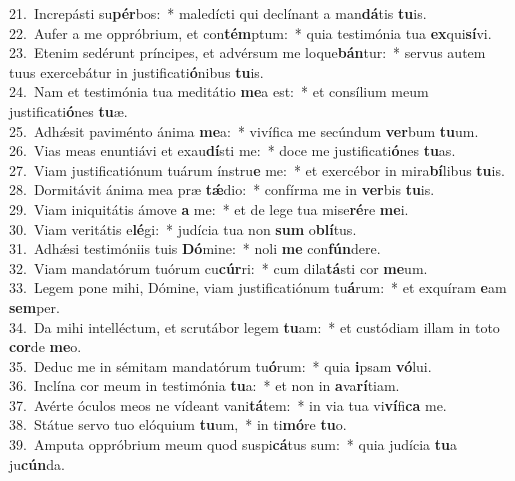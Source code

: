 {21.~}Increpásti su\textbf{pér}bos:~* maledícti qui declínant a man\textbf{dá}tis \textbf{tu}is.\\
{22.~}Aufer a me oppróbrium, et con\textbf{tém}ptum:~* quia testimónia tua \textbf{ex}qui\textbf{sí}vi.\\
{23.~}Etenim sedérunt príncipes, et advérsum me loque\textbf{bán}tur:~* servus autem tuus exercebátur in justificati\textbf{ó}nibus \textbf{tu}is.\\
{24.~}Nam et testimónia tua meditátio \textbf{me}a est:~* et consílium meum justificati\textbf{ó}nes \textbf{tu}æ.\\
{25.~}Adhǽsit paviménto ánima \textbf{me}a:~* vivífica me secúndum \textbf{ver}bum \textbf{tu}um.\\
{26.~}Vias meas enuntiávi et exau\textbf{dí}sti me:~* doce me justificati\textbf{ó}nes \textbf{tu}as.\\
{27.~}Viam justificatiónum tuárum ínstru\textbf{e} me:~* et exercébor in mira\textbf{bí}libus \textbf{tu}is.\\
{28.~}Dormitávit ánima mea præ \textbf{tǽ}dio:~* confírma me in \textbf{ver}bis \textbf{tu}is.\\
{29.~}Viam iniquitátis ámove \textbf{a} me:~* et de lege tua mise\textbf{ré}re \textbf{me}i.\\
{30.~}Viam veritátis e\textbf{lé}gi:~* judícia tua non \textbf{sum} o\textbf{blí}tus.\\
{31.~}Adhǽsi testimóniis tuis \textbf{Dó}mine:~* noli \textbf{me} con\textbf{fún}dere.\\
{32.~}Viam mandatórum tuórum cu\textbf{cúr}ri:~* cum dila\textbf{tá}sti cor \textbf{me}um.\\
{33.~}Legem pone mihi, Dómine, viam justificatiónum tu\textbf{á}rum:~* et exquíram \textbf{e}am \textbf{sem}per.\\
{34.~}Da mihi intelléctum, et scrutábor legem \textbf{tu}am:~* et custódiam illam in toto \textbf{cor}de \textbf{me}o.\\
{35.~}Deduc me in sémitam mandatórum tu\textbf{ó}rum:~* quia \textbf{i}psam \textbf{vó}lui.\\
{36.~}Inclína cor meum in testimónia \textbf{tu}a:~* et non in \textbf{a}va\textbf{rí}tiam.\\
{37.~}Avérte óculos meos ne vídeant vani\textbf{tá}tem:~* in via tua vi\textbf{ví}fi\textbf{ca} me.\\
{38.~}Státue servo tuo elóquium \textbf{tu}um,~* in ti\textbf{mó}re \textbf{tu}o.\\
{39.~}Amputa oppróbrium meum quod suspi\textbf{cá}tus sum:~* quia judícia \textbf{tu}a ju\textbf{cún}da.\\

